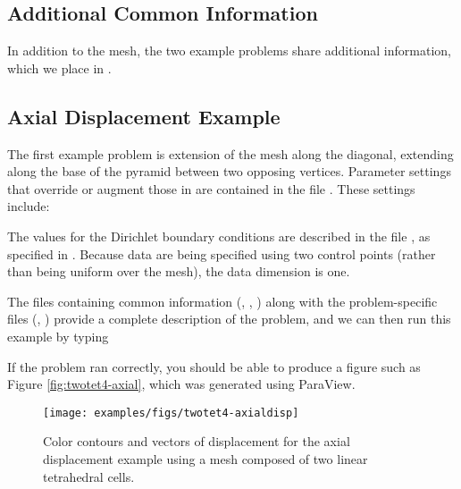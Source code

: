 \subsection{Additional Common Information}

In addition to the mesh, the two example problems share additional
information, which we place in .


\subsection{Axial Displacement Example}

The first example problem is extension of the mesh along the diagonal,
extending along the base of the pyramid between two opposing vertices.
Parameter settings that override or augment those in 
are contained in the file . These settings include:
\begin{inventory}
\end{inventory}
The values for the Dirichlet boundary conditions are described in
the file , as specified in .
Because data are being specified using two control points (rather
than being uniform over the mesh), the data dimension is one.

The files containing common information (,
, ) along with
the problem-specific files (,
) provide a complete description of the
problem, and we can then run this example by typing
If the problem ran correctly, you should be able to produce a figure
such as Figure \vref{fig:twotet4-axial}, which was generated using
ParaView.

\begin{figure}
  \texttt{[image: examples/figs/twotet4-axialdisp]}
  \caption{Color contours and vectors of displacement for the axial displacement
    example using a mesh composed of two linear tetrahedral cells.}
  \label{fig:twotet4-axial}
\end{figure}


